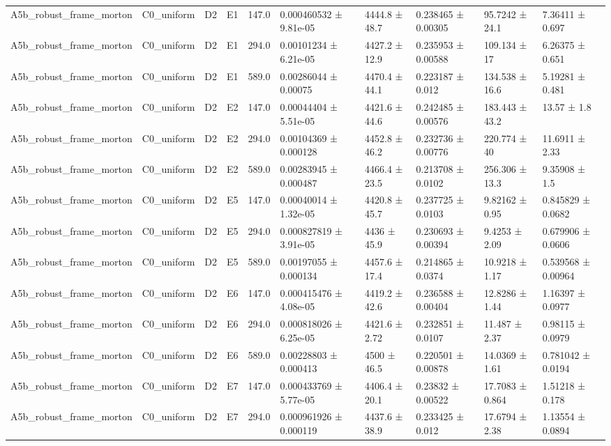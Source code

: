 \begin{table}
\begin{tabular}{llllllllll}
A5b\_robust\_frame\_morton & C0\_uniform & D2 & E1 & 147.0 & 0.000460532 ± 9.81e-05 & 4444.8 ± 48.7 & 0.238465 ± 0.00305 & 95.7242 ± 24.1 & 7.36411 ± 0.697 \\
A5b\_robust\_frame\_morton & C0\_uniform & D2 & E1 & 294.0 & 0.00101234 ± 6.21e-05 & 4427.2 ± 12.9 & 0.235953 ± 0.00588 & 109.134 ± 17 & 6.26375 ± 0.651 \\
A5b\_robust\_frame\_morton & C0\_uniform & D2 & E1 & 589.0 & 0.00286044 ± 0.00075 & 4470.4 ± 44.1 & 0.223187 ± 0.012 & 134.538 ± 16.6 & 5.19281 ± 0.481 \\
A5b\_robust\_frame\_morton & C0\_uniform & D2 & E2 & 147.0 & 0.00044404 ± 5.51e-05 & 4421.6 ± 44.6 & 0.242485 ± 0.00576 & 183.443 ± 43.2 & 13.57 ± 1.8 \\
A5b\_robust\_frame\_morton & C0\_uniform & D2 & E2 & 294.0 & 0.00104369 ± 0.000128 & 4452.8 ± 46.2 & 0.232736 ± 0.00776 & 220.774 ± 40 & 11.6911 ± 2.33 \\
A5b\_robust\_frame\_morton & C0\_uniform & D2 & E2 & 589.0 & 0.00283945 ± 0.000487 & 4466.4 ± 23.5 & 0.213708 ± 0.0102 & 256.306 ± 13.3 & 9.35908 ± 1.5 \\
A5b\_robust\_frame\_morton & C0\_uniform & D2 & E5 & 147.0 & 0.00040014 ± 1.32e-05 & 4420.8 ± 45.7 & 0.237725 ± 0.0103 & 9.82162 ± 0.95 & 0.845829 ± 0.0682 \\
A5b\_robust\_frame\_morton & C0\_uniform & D2 & E5 & 294.0 & 0.000827819 ± 3.91e-05 & 4436 ± 45.9 & 0.230693 ± 0.00394 & 9.4253 ± 2.09 & 0.679906 ± 0.0606 \\
A5b\_robust\_frame\_morton & C0\_uniform & D2 & E5 & 589.0 & 0.00197055 ± 0.000134 & 4457.6 ± 17.4 & 0.214865 ± 0.0374 & 10.9218 ± 1.17 & 0.539568 ± 0.00964 \\
A5b\_robust\_frame\_morton & C0\_uniform & D2 & E6 & 147.0 & 0.000415476 ± 4.08e-05 & 4419.2 ± 42.6 & 0.236588 ± 0.00404 & 12.8286 ± 1.44 & 1.16397 ± 0.0977 \\
A5b\_robust\_frame\_morton & C0\_uniform & D2 & E6 & 294.0 & 0.000818026 ± 6.25e-05 & 4421.6 ± 2.72 & 0.232851 ± 0.0107 & 11.487 ± 2.37 & 0.98115 ± 0.0979 \\
A5b\_robust\_frame\_morton & C0\_uniform & D2 & E6 & 589.0 & 0.00228803 ± 0.000413 & 4500 ± 46.5 & 0.220501 ± 0.00878 & 14.0369 ± 1.61 & 0.781042 ± 0.0194 \\
A5b\_robust\_frame\_morton & C0\_uniform & D2 & E7 & 147.0 & 0.000433769 ± 5.77e-05 & 4406.4 ± 20.1 & 0.23832 ± 0.00522 & 17.7083 ± 0.864 & 1.51218 ± 0.178 \\
A5b\_robust\_frame\_morton & C0\_uniform & D2 & E7 & 294.0 & 0.000961926 ± 0.000119 & 4437.6 ± 38.9 & 0.233425 ± 0.012 & 17.6794 ± 2.38 & 1.13554 ± 0.0894 \\

\end{tabular}
\end{table}
